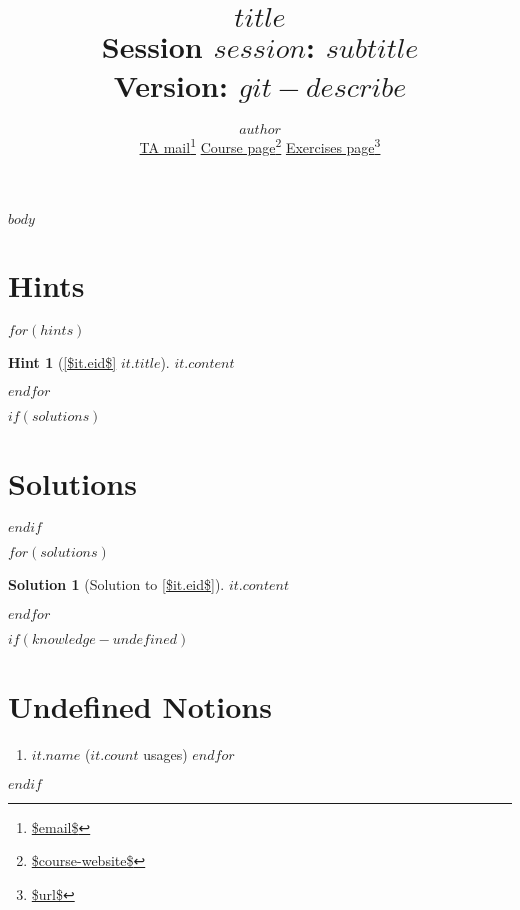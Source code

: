 \documentclass[a4,10pt]{article}
\title{{\bfseries \Huge{$title$}} \\ Session $session$: $subtitle$ \\ Version: $git-describe$}
\author{$author$ \\
        \href{mailto:$email$}{TA mail}\footnote{\url{$email$}}
        \hspace{1em}
        \href{$course-website$}{Course page}\footnote{\url{$course-website$}}
        \hspace{1em}
        \href{$url$}{Exercises page}\footnote{\url{$url$}}
}
\newtheorem{hint}{Hint}
\newtheorem{solution}{Solution}
\begin{document}
\maketitle

$body$

\printbibliography


\clearpage
\appendix

\section{Hints}

$for(hints)$
\begin{hint}[{\cref{$it.eid$} $it.title$}]
    \label{$it.id$}
    $it.content$
\end{hint}
$endfor$

$if(solutions)$
\clearpage
\section{Solutions}
$endif$

$for(solutions)$
\begin{solution}[Solution to \cref{$it.eid$}]
    \label{$it.id$}
    $it.content$
\end{solution}
$endfor$

$if(knowledge-undefined)$
\clearpage
\section{Undefined Notions}
\begin{enumerate}
$for(knowledge-undefined)$
\item \texttt{$it.name$} ($it.count$ usages)
$endfor$
\end{enumerate}
$endif$
\end{document}
